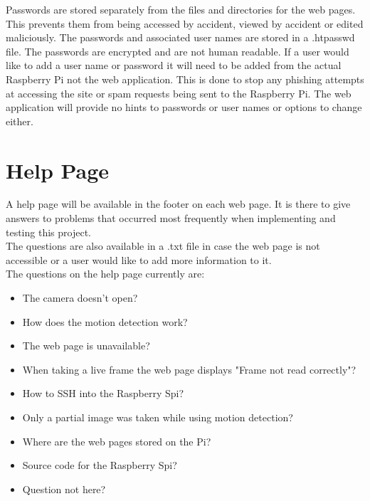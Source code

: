 \documentclass[12pt]{report}
\begin{document}
Passwords are stored separately from the files and directories for the web pages. This prevents them from being accessed by accident, viewed by accident or edited maliciously. The passwords and associated user names are stored in a .htpasswd file. The passwords are encrypted and are not human readable. If a user would like to add a user name or password it will need to be added from the actual Raspberry Pi not the web application. This is done to stop any phishing attempts at accessing the site or spam requests being sent to the Raspberry Pi. The web application will provide no hints to passwords or user names or options to change either.\\

\section{Help Page}
\label{sec:help}

A help page will be available in the footer on each web page. It is there to give answers to problems that occurred most frequently when implementing and testing this project.\\

The questions are also available in a .txt file in case the web page is not accessible or a user would like to add more information to it.\\

{The questions on the help page currently are:\\}

\begin{itemize}
  \item The camera doesn't open?\\
  \item How does the motion detection work? \\
  \item The web page is unavailable?\\
  \item When taking a live frame the web page displays "Frame not read correctly"?\\
  \item How to SSH into the Raspberry Spi?\\
  \item Only a partial image was taken while using motion detection?\\
  \item Where are the web pages stored on the Pi?\\
  \item Source code for the Raspberry Spi?\\
  \item Question not here?\\
\end{itemize}
\end{document}
